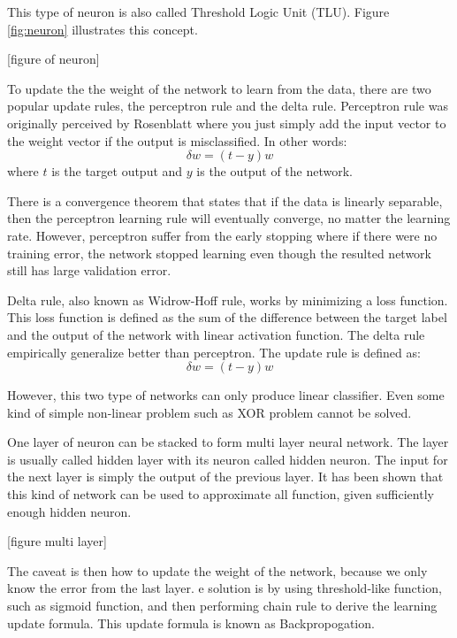\documentclass[a4paper,11pt]{kth-mag}
\begin{document}
This type of neuron is also called Threshold Logic Unit (TLU). Figure \ref{fig:neuron} illustrates this concept.

[figure of neuron]

To update the the weight of the network to learn from the data, there are two popular update rules, the perceptron rule and the delta rule. Perceptron rule was originally perceived by Rosenblatt \cite{rosenblatt1957} where you just simply add the input vector to the weight vector if the output is misclassified. In other words:
\begin{equation}
\delta w = (t-y) w
\end{equation}
where $t$ is the target output and $y$ is the output of the network.

There is a convergence theorem that states that if the data is linearly separable, then the perceptron learning rule will eventually converge, no matter the learning rate. However, perceptron suffer from the early stopping where if there were no training error, the network stopped learning even though the resulted network still has large validation error.

Delta rule, also known as Widrow-Hoff rule, works by minimizing a loss function. This loss function is defined as the sum of the difference between the target label and the output of the network with linear activation function. The delta rule empirically generalize better than perceptron. The update rule is defined as:
\begin{equation}
\delta w = (t-y) w
\end{equation}

However, this two type of networks can only produce linear classifier. Even some kind of simple non-linear problem such as XOR problem cannot be solved.

One layer of neuron can be stacked to form multi layer neural network. The layer is usually called hidden layer with its neuron called hidden neuron. The input for the next layer is simply the output of the previous layer. It has been shown that this kind of network can be used to approximate all function, given sufficiently enough hidden neuron.

[figure multi layer]

The caveat is then how to update the weight of the network, because we only know the error from the last layer. e solution is by using threshold-like function, such as sigmoid function, and then performing chain rule to derive the learning update formula. This update formula is known as Backpropogation.
\end{document}
